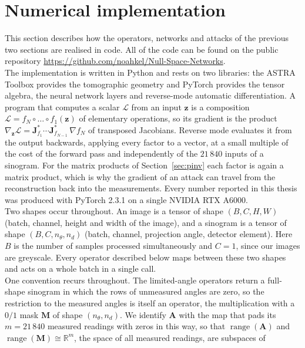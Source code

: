 \documentclass{article}
\numberwithin{equation}{section}
\begin{document}
\section{Numerical implementation}\label{sec:implementation}
This section describes how the operators, networks and attacks of the previous
two sections are realised in code. All of the code can be found on the public repository \url{https://github.com/noahkel/Null-Space-Networks}.\\
The implementation is written in Python and
rests on two libraries: the ASTRA Toolbox \parencite{Astra} provides the tomographic geometry and
PyTorch \parencite{Pytorch} provides the tensor algebra,
the neural network layers and reverse-mode automatic differentiation.
A program that computes a scalar $\mathcal{L}$ from an input $\mathbf{z}$ is a composition
$\mathcal{L}=f_N\circ\dots\circ f_1(\mathbf{z})$ of elementary operations, so its gradient is the product
$\nabla_{\!\mathbf{z}}\mathcal{L}=\mathbf{J}_{f_1}^{*}\cdots\mathbf{J}_{f_{N-1}}^{*}\,\nabla f_N$ of transposed
Jacobians. Reverse mode evaluates it from the output backwards, applying every factor to a vector, at a
small multiple of the cost of the forward pass and independently of the $21\,840$ inputs of a sinogram.
For the matrix products of Section~\ref{sec:pinv} each factor is again a matrix product, which is why the
gradient of an attack can travel from the reconstruction back into the measurements.
Every number reported in this thesis was produced with PyTorch 2.3.1 on a single NVIDIA RTX A6000.\\
Two shapes occur throughout. An image is a tensor of shape $(B,C,H,W)$ (batch,
channel, height and width of the image), and a sinogram is a tensor of shape
$(B,C,n_\theta,n_d)$ (batch, channel, projection angle, detector element).
Here $B$ is the number of samples processed simultaneously and $C=1$, since our
images are greyscale. Every operator described below maps between these two
shapes and acts on a whole batch in a single call.\\
One convention recurs throughout. The limited-angle operators return a full-shape sinogram in which the
rows of unmeasured angles are zero, so the restriction to the measured angles is itself an operator, the
multiplication with a $0/1$ mask $\mathbf{M}$ of shape $(n_\theta,n_d)$. We identify $\mathbf{A}$ with the
map that pads its $m=21\,840$ measured readings with zeros in this way, so that $\operatorname{range}(\mathbf{A})$
and $\operatorname{range}(\mathbf{M})\cong\mathbb{R}^m$, the space of all measured readings, are subspaces of
\end{document}
